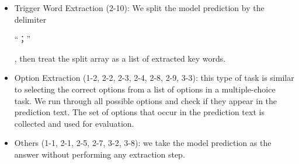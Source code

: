 \begin{itemize}
    \item Trigger Word Extraction (2-10): We split the model prediction by the delimiter \begin{CJK*}{UTF8}{gbsn} ``；'' \end{CJK*}, then treat the split array as a list of extracted key words.
    \item Option Extraction (1-2, 2-2, 2-3, 2-4, 2-8, 2-9, 3-3): this type of task is similar to selecting the correct options from a list of options in a multiple-choice task. We run through all possible options and check if they appear in the prediction text. The set of options that occur in the prediction text is collected and used for evaluation.
    \item Others (1-1, 2-1, 2-5, 2-7, 3-2, 3-8): we take the model prediction as the answer without performing any extraction step. 
    
\end{itemize}

